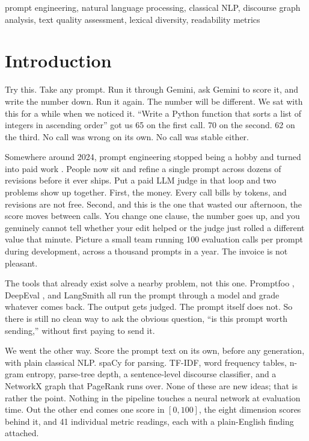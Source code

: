 \documentclass[conference]{IEEEtran}
\begin{document}
\begin{IEEEkeywords}
prompt engineering, natural language processing, classical NLP, discourse graph analysis, text quality assessment, lexical diversity, readability metrics
\end{IEEEkeywords}

\section{Introduction}

Try this. Take any prompt. Run it through Gemini, ask Gemini to score it, and write the number down. Run it again. The number will be different. We sat with this for a while when we noticed it. ``Write a Python function that sorts a list of integers in ascending order'' got us 65 on the first call. 70 on the second. 62 on the third. No call was wrong on its own. No call was stable either.

Somewhere around 2024, prompt engineering stopped being a hobby and turned into paid work \cite{prompteng_survey}. People now sit and refine a single prompt across dozens of revisions before it ever ships. Put a paid LLM judge in that loop and two problems show up together. First, the money. Every call bills by tokens, and revisions are not free. Second, and this is the one that wasted our afternoon, the score moves between calls. You change one clause, the number goes up, and you genuinely cannot tell whether your edit helped or the judge just rolled a different value that minute. Picture a small team running 100 evaluation calls per prompt during development, across a thousand prompts in a year. The invoice is not pleasant.

The tools that already exist solve a nearby problem, not this one. Promptfoo \cite{promptfoo}, DeepEval \cite{deepeval}, and LangSmith \cite{langsmith} all run the prompt through a model and grade whatever comes back. The output gets judged. The prompt itself does not. So there is still no clean way to ask the obvious question, ``is this prompt worth sending,'' without first paying to send it.

We went the other way. Score the prompt text on its own, before any generation, with plain classical NLP. spaCy for parsing. TF-IDF, word frequency tables, n-gram entropy, parse-tree depth, a sentence-level discourse classifier, and a NetworkX graph that PageRank runs over. None of these are new ideas; that is rather the point. Nothing in the pipeline touches a neural network at evaluation time. Out the other end comes one score in $[0, 100]$, the eight dimension scores behind it, and 41 individual metric readings, each with a plain-English finding attached.
\end{document}
